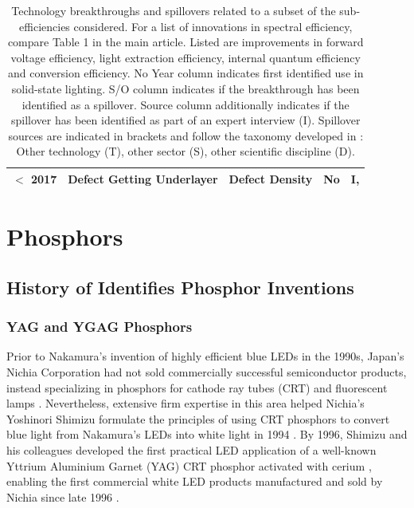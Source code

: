 \documentclass[10pt]{article}
\begin{document}
\begin{table}[H]
\begin{tabularx}{\textwidth}{ |l|X|X|l|l| }
        \hline
            $<$ 2017 & Defect Getting \newline Underlayer & Defect Density & No & I, \cite{haller2017burying} \\
        \hline
        \end{tabularx}
    \caption{Technology breakthroughs and spillovers related to a subset of the sub-efficiencies considered. For a list of innovations in spectral efficiency, compare Table 1 in the main article. Listed are improvements in forward voltage efficiency, light extraction efficiency, internal quantum efficiency and conversion efficiency. No  Year column indicates first identified use in solid-state lighting. S/O column indicates if the breakthrough has been identified as a spillover. Source column additionally indicates if the spillover has been identified as part of an expert interview (I). Spillover sources are indicated in brackets and follow the taxonomy developed in \cite{Stephan_2021}: Other technology (T), other sector (S), other scientific discipline (D). }
    \label{tab:innovations}
\end{table}

\newpage
\section{Phosphors}

\subsection{History of Identifies Phosphor Inventions}

\subsubsection{YAG and YGAG Phosphors}

Prior to Nakamura’s invention of highly efficient blue LEDs in the 1990s, Japan’s Nichia Corporation had not sold commercially successful semiconductor products, instead specializing in phosphors for cathode ray tubes (CRT) and fluorescent lamps \cite{nakamura2013blue}  . Nevertheless, extensive firm expertise in this area helped Nichia’s Yoshinori Shimizu formulate the principles of using CRT phosphors to convert blue light from Nakamura’s LEDs into white light in 1994 \cite{shimizu1994sheet}\cite{cho2017white}. By 1996, Shimizu and his colleagues developed \cite{bando1996}\cite{shimizu1999light} the first practical LED application of a well-known Yttrium Aluminium Garnet (YAG) CRT phosphor activated with cerium \cite{blasse1967new}, enabling the first commercial white LED products manufactured and sold by Nichia since late 1996 \cite{bando1998development}\cite{cho2017white}. 
\end{document}
